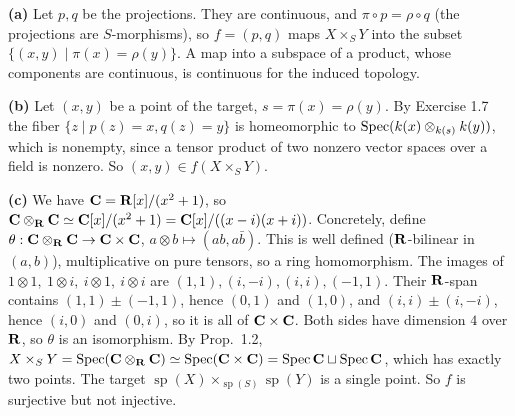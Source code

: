 \documentclass[11pt]{article}
\begin{document}
\pf
\textbf{(a)} Let $p,q$ be the projections. They are continuous, and $\pi\circ p=\rho\circ q$ (the projections are $S$-morphisms), so $f=(p,q)$ maps $X\times_SY$ into the subset $\{(x,y)\mid\pi(x)=\rho(y)\}$. A map into a subspace of a product, whose components are continuous, is continuous for the induced topology.

\textbf{(b)} Let $(x,y)$ be a point of the target, $s=\pi(x)=\rho(y)$. By Exercise 1.7 the fiber $\{z\mid p(z)=x,q(z)=y\}$ is homeomorphic to $\operatorname{Spec}(k(x)\otimes_{k(s)}k(y))$, which is nonempty, since a tensor product of two nonzero vector spaces over a field is nonzero. So $(x,y)\in f(X\times_SY)$.

\textbf{(c)} We have $\mathbf C=\mathbf R[x]/(x^2+1)$, so $\mathbf C\otimes_\mathbf R\mathbf C\simeq\mathbf C[x]/(x^2+1)=\mathbf C[x]/((x-i)(x+i))$. Concretely, define $\theta:\mathbf C\otimes_\mathbf R\mathbf C\to\mathbf C\times\mathbf C$, $a\otimes b\mapsto(ab,a\bar b)$. This is well defined ($\mathbf R$-bilinear in $(a,b)$), multiplicative on pure tensors, so a ring homomorphism. The images of $1\otimes1,\ 1\otimes i,\ i\otimes1,\ i\otimes i$ are $(1,1),(i,-i),(i,i),(-1,1)$. Their $\mathbf R$-span contains $(1,1)\pm(-1,1)$, hence $(0,1)$ and $(1,0)$, and $(i,i)\pm(i,-i)$, hence $(i,0)$ and $(0,i)$, so it is all of $\mathbf C\times\mathbf C$. Both sides have dimension $4$ over $\mathbf R$, so $\theta$ is an isomorphism. By Prop.~1.2, $X\times_SY=\operatorname{Spec}(\mathbf C\otimes_\mathbf R\mathbf C)\simeq\operatorname{Spec}(\mathbf C\times\mathbf C)=\operatorname{Spec}\mathbf C\sqcup\operatorname{Spec}\mathbf C$, which has exactly two points. The target $\operatorname{sp}(X)\times_{\operatorname{sp}(S)}\operatorname{sp}(Y)$ is a single point. So $f$ is surjective but not injective.
\end{document}
